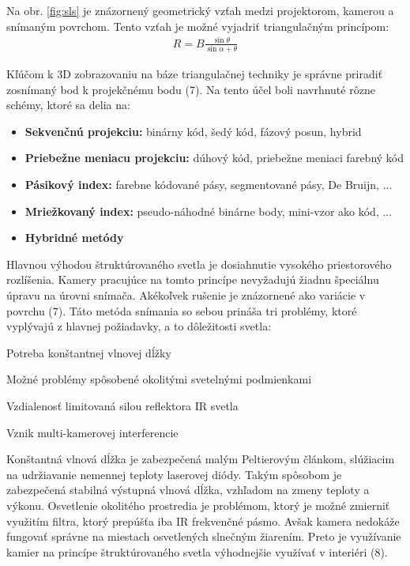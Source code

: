 Na obr. \ref{fig:sls} je znázornený geometrický vzťah medzi projektorom, kamerou a snímaným povrchom. Tento vzťah je možné vyjadriť triangulačným princípom:
\begin{equation}
\label{eq1}
\begin{aligned}
R=B\frac{\sin\theta}{\sin\alpha + \theta}
\end{aligned}
\end{equation}

Kľúčom k 3D zobrazovaniu na báze triangulačnej techniky je správne priradiť zosnímaný bod
k projekčnému bodu (7). Na tento účel boli navrhnuté rôzne schémy, ktoré sa delia na:

\begin{itemize}
	\item \textbf{Sekvenčnú projekciu:} binárny kód, šedý kód, fázový posun, hybrid 
	\item \textbf{Priebežne meniacu projekciu:} dúhový kód, priebežne meniaci farebný kód 
	\item \textbf{Pásikový index:} farebne kódované pásy, segmentované pásy, De Bruijn, ...
	\item \textbf{Mriežkovaný index:} pseudo-náhodné binárne body, mini-vzor ako kód, ...
	\item \textbf{Hybridné metódy} 
\end{itemize}

Hlavnou výhodou štruktúrovaného svetla je dosiahnutie vysokého priestorového rozlíšenia. Kamery pracujúce na tomto princípe nevyžadujú žiadnu špeciálnu úpravu na úrovni snímača. Akékoľvek rušenie je znázornené ako variácie v povrchu (7). Táto metóda snímania so sebou prináša tri problémy, ktoré vyplývajú z hlavnej požiadavky, a to dôležitosti svetla:


\begin{compactitem}
	\item Potreba konštantnej vlnovej dĺžky 
	\item Možné problémy spôsobené okolitými svetelnými podmienkami 
	\item Vzdialenosť limitovaná silou reflektora IR svetla
	\item Vznik multi-kamerovej interferencie
\end{compactitem} 
\vline

Konštantná vlnová dĺžka je zabezpečená malým Peltierovým článkom, slúžiacim na udržiavanie nemennej teploty laserovej diódy. Takým spôsobom je zabezpečená stabilná výstupná vlnová dĺžka, vzhľadom na zmeny teploty a výkonu. Osvetlenie okolitého prostredia je problémom, ktorý je možné zmierniť využitím filtra, ktorý prepúšťa iba IR frekvenčné pásmo. Avšak kamera nedokáže fungovať správne na miestach osvetlených slnečným žiarením. Preto je využívanie kamier na princípe štruktúrovaného svetla výhodnejšie využívať v interiéri (8).

